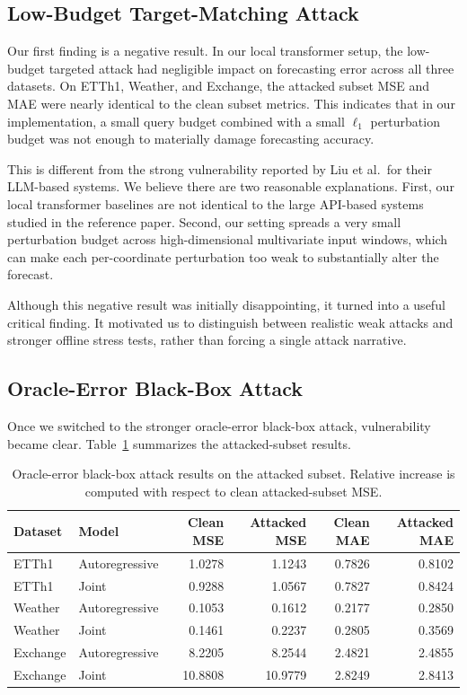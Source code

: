 \documentclass[11pt]{article}
\begin{document}
\subsection{Low-Budget Target-Matching Attack}
Our first finding is a negative result. In our local transformer setup, the low-budget targeted attack had negligible impact on forecasting error across all three datasets. On ETTh1, Weather, and Exchange, the attacked subset MSE and MAE were nearly identical to the clean subset metrics. This indicates that in our implementation, a small query budget combined with a small $\ell_1$ perturbation budget was not enough to materially damage forecasting accuracy.

This is different from the strong vulnerability reported by Liu et al.\ for their LLM-based systems. We believe there are two reasonable explanations. First, our local transformer baselines are not identical to the large API-based systems studied in the reference paper. Second, our setting spreads a very small perturbation budget across high-dimensional multivariate input windows, which can make each per-coordinate perturbation too weak to substantially alter the forecast.

Although this negative result was initially disappointing, it turned into a useful critical finding. It motivated us to distinguish between realistic weak attacks and stronger offline stress tests, rather than forcing a single attack narrative.

\subsection{Oracle-Error Black-Box Attack}
Once we switched to the stronger oracle-error black-box attack, vulnerability became clear. Table~\ref{tab:oracle} summarizes the attacked-subset results.

\begin{table}[t]
\centering
\caption{Oracle-error black-box attack results on the attacked subset. Relative increase is computed with respect to clean attacked-subset MSE.}
\label{tab:oracle}
\begin{tabular}{llrrrr}
\toprule
Dataset & Model & Clean MSE & Attacked MSE & Clean MAE & Attacked MAE \\
\midrule
ETTh1 & Autoregressive & 1.0278 & 1.1243 & 0.7826 & 0.8102 \\
ETTh1 & Joint & 0.9288 & 1.0567 & 0.7827 & 0.8424 \\
Weather & Autoregressive & 0.1053 & 0.1612 & 0.2177 & 0.2850 \\
Weather & Joint & 0.1461 & 0.2237 & 0.2805 & 0.3569 \\
Exchange & Autoregressive & 8.2205 & 8.2544 & 2.4821 & 2.4855 \\
Exchange & Joint & 10.8808 & 10.9779 & 2.8249 & 2.8413 \\
\bottomrule
\end{tabular}
\end{table}
\end{document}
